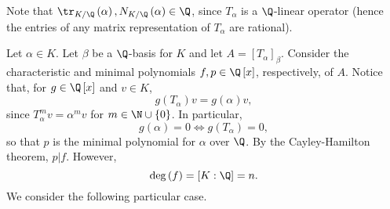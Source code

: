 \documentclass[pmath441]{subfiles}
\begin{document}
    \np Note that $\tr_{K /\Q}\left( \alpha \right), N_{K /\Q}\left( \alpha \right)\in\Q$, since $T_{\alpha}$ is a $\Q$-linear operator (hence the entries of any matrix representation of $T_{\alpha}$ are rational).

    \np Let $\alpha\in K$. Let $\beta$ be a $\Q$-basis for $K$ and let $A = \left[ T_{\alpha} \right]_{\beta}$. Consider the characteristic and minimal polynomials $f,p\in\Q\left[ x \right]$, respectively, of $A$. Notice that, for $g\in\Q\left[ x \right]$ and $v\in K$,
    \begin{equation*}
        g\left( T_{\alpha} \right)v = g\left( \alpha \right)v,
    \end{equation*}
    since $T_{\alpha}^mv = \alpha^mv$ for $m\in\N\cup\left\lbrace 0 \right\rbrace$. In particular,
    \begin{equation*}
        g\left( \alpha \right) = 0 \iff g\left( T_{\alpha} \right) = 0,
    \end{equation*}
    so that $p$ is the minimal polynomial for $\alpha$ over $\Q$. By the Cayley-Hamilton theorem, $p|f$. However,
    \begin{equation*}
        \deg\left( f \right) = \left[ K:\Q \right] = n.
    \end{equation*}
    We consider the following particular case.

    \clearpage
\end{document}
